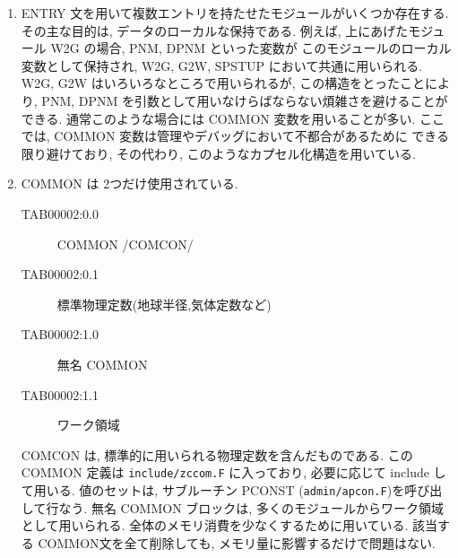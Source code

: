\begin{enumerate}
\item ENTRY 文を用いて複数エントリを持たせたモジュールがいくつか存在する.
その主な目的は, データのローカルな保持である.
例えば, 上にあげたモジュール W2G の場合, PNM, DPNM といった変数が
このモジュールのローカル変数として保持され,
W2G, G2W, SPSTUP において共通に用いられる.
W2G, G2W はいろいろなところで用いられるが, この構造をとったことにより,
PNM, DPNM を引数として用いなけらばならない煩雑さを避けることができる.
通常このような場合には COMMON 変数を用いることが多い.
ここでは, COMMON 変数は管理やデバッグにおいて不都合があるために
できる限り避けており, その代わり, このようなカプセル化構造を用いている.

\item COMMON は 2つだけ使用されている.
\begin{center}
  \begin{description}
\item[TAB00002:0.0] COMMON /COMCON/
\item[TAB00002:0.1] 標準物理定数(地球半径,気体定数など)
\item[TAB00002:1.0] 無名 COMMON
\item[TAB00002:1.1] ワーク領域
\end{description}
\end{center}
COMCON は, 標準的に用いられる物理定数を含んだものである.
この COMMON 定義は {\tt include/zccom.F} に入っており,
必要に応じて include して用いる. 
値のセットは,  サブルーチン PCONST ({\tt admin/apcon.F})を呼び出して行なう.
%
無名 COMMON ブロックは, 多くのモジュールからワーク領域として用いられる.
全体のメモリ消費を少なくするために用いている.
該当する COMMON文を全て削除しても, メモリ量に影響するだけで問題はない.


\end{enumerate}
